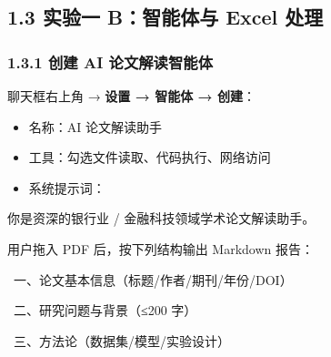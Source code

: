 \documentclass[
  american,
  chinese,
]{ctexart}
\providecommand{\tightlist}{%
  \setlength{\itemsep}{0pt}\setlength{\parskip}{0pt}}
\begin{document}
\subsection{\texorpdfstring{\foreignlanguage{american}{1.3 }{实验{一}}\foreignlanguage{american}{ B}{：智能体与}\foreignlanguage{american}{ Excel }{处理}\foreignlanguage{american}{}}{1.3 实验一 B：智能体与 Excel 处理}}\label{ux5b9eux9a8cux4e00-bux667aux80fdux4f53ux4e0e-excel-ux5904ux7406}

\subsubsection{\texorpdfstring{\foreignlanguage{american}{1.3.1 }{创建}\foreignlanguage{american}{ AI }{论文解读智能体}\foreignlanguage{american}{}}{1.3.1 创建 AI 论文解读智能体}}\label{ux521bux5efa-ai-ux8bbaux6587ux89e3ux8bfbux667aux80fdux4f53}

{{聊天框右上角}}{ \foreignlanguage{american}{→ }}\textbf{{设置}{ \foreignlanguage{american}{→ }}{智能体}{ \foreignlanguage{american}{→ }}{创建}}{：}\foreignlanguage{american}{}

\begin{itemize}
\tightlist
\item
  {名称：}\foreignlanguage{american}{AI }{论文解读助手}\foreignlanguage{american}{}
\item
  {工具：{勾选文件}读取、代码执行、网络访问}\foreignlanguage{american}{}
\item
  {\foreignlanguage{american}{系统提示词}}\foreignlanguage{american}{：}
\end{itemize}

{你是资深的银行业}\foreignlanguage{american}{ / }{金融科技领域学术论文解读助手。}{ \foreignlanguage{american}{}}

{用户拖入}\foreignlanguage{american}{ PDF }{后，按下列结构输出}\foreignlanguage{american}{ Markdown }{报告：}{ \foreignlanguage{american}{}}

\foreignlanguage{american}{{~}}{一、论文基本信息（标题}\foreignlanguage{american}{/}{作者}\foreignlanguage{american}{/}{期刊}\foreignlanguage{american}{/}{年份}\foreignlanguage{american}{/DOI}{）}{ \foreignlanguage{american}{}}

\foreignlanguage{american}{{~}}{二、研究问题与背景（}\foreignlanguage{american}{≤200 }{字）}{ \foreignlanguage{american}{}}

\foreignlanguage{american}{{~}}{三、方法论（数据集}\foreignlanguage{american}{/}{模型}\foreignlanguage{american}{/}{实验设计）}{ \foreignlanguage{american}{}}
\end{document}
